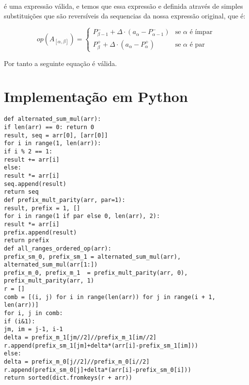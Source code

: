 \documentclass{article}
\begin{document}
é uma expressão válida, e temos que essa expressão e definida através de simples substituições que são reversíveis da sequencias da nossa expressão original, que é: 

\begin{equation*}
op(A_{[\alpha, \beta]}) = \begin{cases}
P^{-}_{\beta-1} + \Delta \cdot (a_\alpha - P^{-}_{\alpha-1}) & \text{se } \alpha \text{ é ímpar} \\
P^{+}_{\beta} + \Delta \cdot (a_\alpha - P^{+}_{\alpha}) & \text{se } \alpha \text{ é par}
\end{cases}
\end{equation*}

Por tanto a seguinte equação é válida.




\section{Implementação em Python}
\begin{verbatim}
def alternated_sum_mul(arr):
if len(arr) == 0: return 0
result, seq = arr[0], [arr[0]]
for i in range(1, len(arr)):
if i % 2 == 1:
result += arr[i]
else:
result *= arr[i]
seq.append(result)
return seq
def prefix_mult_parity(arr, par=1):
result, prefix = 1, []
for i in range(1 if par else 0, len(arr), 2):
result *= arr[i]
prefix.append(result)
return prefix
def all_ranges_ordered_op(arr):
prefix_sm_0, prefix_sm_1 = alternated_sum_mul(arr), alternated_sum_mul(arr[1:])
prefix_m_0, prefix_m_1  = prefix_mult_parity(arr, 0), prefix_mult_parity(arr, 1)
r = []
comb = [(i, j) for i in range(len(arr)) for j in range(i + 1, len(arr))]
for i, j in comb:
if (i&1):
jm, im = j-1, i-1
delta = prefix_m_1[jm//2]//prefix_m_1[im//2]
r.append(prefix_sm_1[jm]+delta*(arr[i]-prefix_sm_1[im]))
else:
delta = prefix_m_0[j//2]//prefix_m_0[i//2]
r.append(prefix_sm_0[j]+delta*(arr[i]-prefix_sm_0[i]))
return sorted(dict.fromkeys(r + arr))
\end{verbatim}
\end{document}
